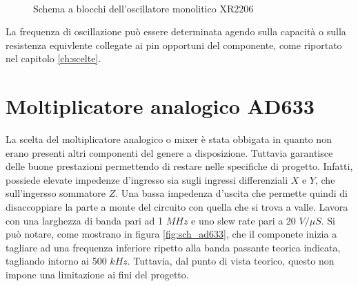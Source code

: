 \documentclass[titlepage]{report}
\begin{document}
	\begin{figure}[h]
		\centering
		 \qquad
		 \\
		\caption{Schema a blocchi dell'oscillatore monolitico XR2206}
		\label{fig:sch_xr2206}
	\end{figure}

	La frequenza di oscillazione può essere determinata agendo sulla capacità o sulla resistenza equivlente collegate ai pin opportuni del componente, come riportato nel capitolo \ref{ch:scelte}.
	
	
\section{Moltiplicatore analogico AD633}
	\label{sec:AD633}
	La scelta del moltiplicatore analogico o mixer è stata obbigata in quanto non erano presenti altri componenti del genere a disposizione.
	Tuttavia garantisce delle buone prestazioni permettendo di restare nelle specifiche di progetto.
	Infatti, possiede elevate impedenze d'ingresso sia sugli ingressi differenziali $X$ e $Y$, che sull'ingersso sommatore $Z$. Una bassa impedenza d'uscita che permette quindi di disaccoppiare la parte a monte del circuito con quella che si trova a valle. Lavora con una larghezza di banda pari ad 1 $MHz$ e uno slew rate pari a 20 $V/\mu S$. 
	Si può notare, come mostrano in figura \ref{fig:sch_ad633}, che il componete inizia a tagliare ad una frequenza inferiore ripetto alla banda passante teorica indicata, tagliando intorno ai 500 $kHz$.
	Tuttavia, dal punto di vista teorico, questo non impone una limitazione ai fini del progetto.
\end{document}
